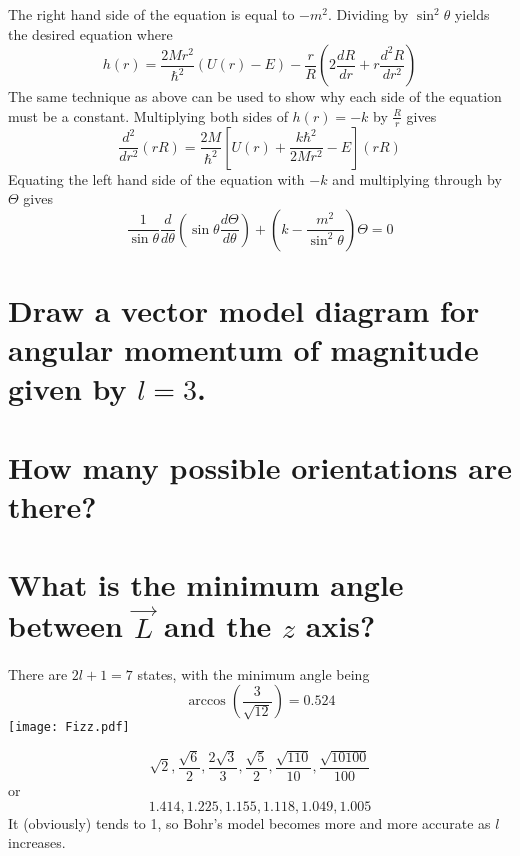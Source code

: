 \documentclass[answers]{exam}
\begin{document}
\begin{questions}
\begin{parts}
	\begin{solution}
		The right hand side of the equation is equal to $-m^2$. Dividing by $\sin^2\theta$ yields the desired equation where
		$$h(r) = \frac{2Mr^2}{\hbar^2}(U(r)-E) - \frac{r}{R}(2\frac{dR}{dr} + r\frac{d^2R}{dr^2})$$
		The same technique as above can be used to show why each side of the equation must be a constant. Multiplying both sides of $h(r) = -k$ by $\frac{R}{r}$ gives
		$$\frac{d^2}{dr^2}(rR) = \frac{2M}{\hbar^2}\left[U(r) + \frac{k\hbar^2}{2Mr^2}-E\right](rR)$$
		Equating the left hand side of the equation with $-k$ and multiplying through by $\Theta$ gives
		$$\frac{1}{\sin\theta}\frac{d}{d\theta}\left(\sin\theta\frac{d\Theta}{d\theta}\right) + \left(k - \frac{m^2}{\sin^2\theta}\right)\Theta = 0$$
	\end{solution}
\end{parts}

\question{}
\begin{parts}
	\part{Draw a vector model diagram for angular momentum of magnitude given by $l=3$.}
	\part{How many possible orientations are there?}
	\part{What is the minimum angle between $\vec{L}$ and the $z$ axis?}
\end{parts}

\begin{solution}
	There are $2l+1=7$ states, with the minimum angle being
	$$\arccos\left(\frac{3}{\sqrt{12}}\right) = 0.524$$
	\texttt{[image: Fizz.pdf]}
\end{solution}


\begin{solution}
	$$\sqrt{2}, \frac{\sqrt{6}}{2}, \frac{2\sqrt{3}}{3}, \frac{\sqrt{5}}{2}, \frac{\sqrt{110}}{10}, \frac{\sqrt{10100}}{100}$$
	or
	$$1.414,1.225,1.155,1.118,1.049, 1.005$$
	It (obviously) tends to 1, so Bohr's model becomes more and more accurate as $l$ increases.
\end{solution}


\end{questions}
\end{document}
